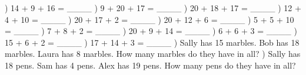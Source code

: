 \documentclass{article}%
\begin{document}
) 14 + 9 + 16 = \_\_\_\_%
\newline%
\newline%
) 9 + 20 + 17 = \_\_\_\_%
\newline%
\newline%
) 20 + 18 + 17 = \_\_\_\_%
\newline%
\newline%
) 12 + 4 + 10 = \_\_\_\_%
\newline%
\newline%
) 20 + 17 + 2 = \_\_\_\_%
\newline%
\newline%
) 20 + 12 + 6 = \_\_\_\_%
\newline%
\newline%
) 5 + 5 + 10 = \_\_\_\_%
\newline%
\newline%
) 7 + 8 + 2 = \_\_\_\_%
\newline%
\newline%
) 20 + 9 + 14 = \_\_\_\_%
\newline%
\newline%
) 6 + 6 + 3 = \_\_\_\_%
\newline%
\newline%
) 15 + 6 + 2 = \_\_\_\_%
\newline%
\newline%
) 17 + 14 + 3 = \_\_\_\_%
\newline%
\newline%
) Sally has 15 marbles. Bob has 18 marbles. Laura has 8 marbles. How many marbles do they have in all?%
\newline%
\newline%
) Sally has 18 pens. Sam has 4 pens. Alex has 19 pens. How many pens do they have in all?%
\newline%
\newline%
\end{document}
